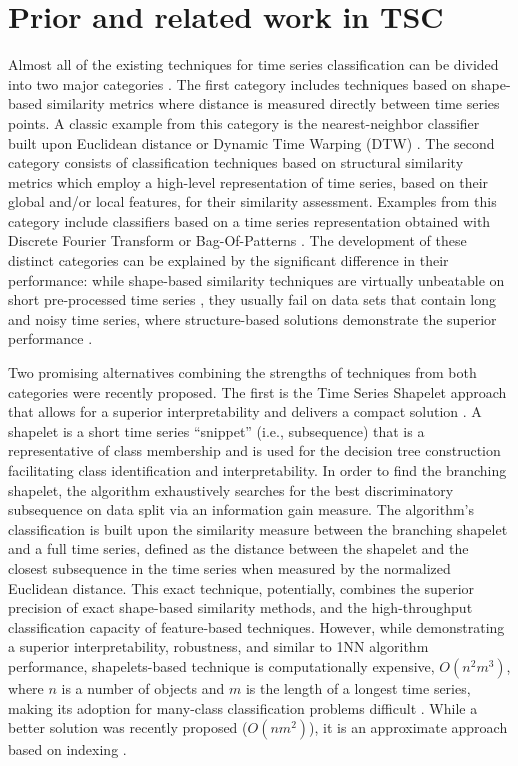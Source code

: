 \section{Prior and related work in TSC} \label{sax_vsm_prior}
Almost all of the existing techniques for time series classification can be divided into two major categories \cite{citeulike:11796594}. 
The first category includes techniques based on shape-based similarity metrics where distance is measured directly between 
time series points. A classic example from this category is the nearest-neighbor classifier built upon Euclidean distance 
\cite{citeulike:4214336} or Dynamic Time Warping (DTW) \cite{senin2008dynamic}. 
The second category consists of classification techniques based on structural similarity metrics which employ a high-level 
representation of time series, based on their global and/or local features, for their similarity assessment. 
Examples from this category include classifiers based on a time series representation obtained with 
Discrete Fourier Transform \cite{citeulike:5094223} or Bag-Of-Patterns \cite{citeulike:10525778}. 
The development of these distinct categories can be explained by the significant difference in their performance: 
while shape-based similarity techniques are virtually unbeatable on short pre-processed time series \cite{citeulike:532340}, 
they usually fail on data sets that contain long and noisy time series, 
where structure-based solutions demonstrate the superior performance \cite{citeulike:10525778}. 

Two promising alternatives combining the strengths of techniques from both categories were recently proposed.
The first is the Time Series Shapelet approach that allows for a superior interpretability and delivers a compact 
solution \cite{citeulike:7344347}. 
A shapelet is a short time series ``snippet'' (i.e., subsequence) that is a representative of class membership and is used for 
the decision tree construction facilitating class identification and interpretability.
In order to find the branching shapelet, the algorithm exhaustively searches for the best discriminatory subsequence on data split 
via an information gain measure. The algorithm's classification is built upon the similarity measure between the branching 
shapelet and a full time series, defined as the distance between the shapelet and the closest subsequence in the time series 
when measured by the normalized Euclidean distance. This exact technique, potentially, combines the superior precision of 
exact shape-based similarity methods, and the high-throughput classification capacity of feature-based techniques. 
However, while demonstrating a superior interpretability, robustness, and similar to 1NN algorithm performance, shapelets-based 
technique is computationally expensive, $O(n^{2}m^{3})$, where $n$ is a number of objects and $m$ is the length of a longest 
time series, making its adoption for many-class classification problems difficult \cite{citeulike:11345338}. 
While a better solution was recently proposed ($O(nm^{2})$), it is an approximate approach based on indexing \cite{citeulike:12563493}.

